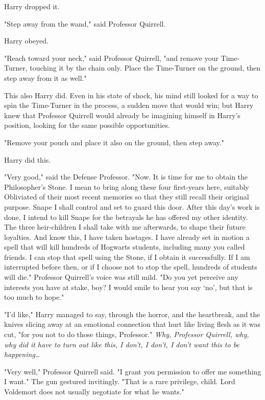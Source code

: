 Harry dropped it.

"Step away from the wand," said Professor Quirrell.

Harry obeyed.

"Reach toward your neck," said Professor Quirrell, "and remove your
Time-Turner, touching it by the chain only. Place the Time-Turner on the
ground, then step away from it as well."

This also Harry did. Even in his state of shock, his mind still looked for a
way to spin the Time-Turner in the process, a sudden move that would win; but
Harry knew that Professor Quirrell would already be imagining himself in
Harry's position, looking for the same possible opportunities.

"Remove your pouch and place it also on the ground, then step away."

Harry did this.

"Very good," said the Defense Professor. "Now. It is time for me to obtain the
Philosopher's Stone. I mean to bring along these four first-years here,
suitably Obliviated of their most recent memories so that they still recall
their original purpose. Snape I shall control and set to guard this door. After
this day's work is done, I intend to kill Snape for the betrayals he has
offered my other identity. The three heir-children I shall take with me
afterwards, to shape their future loyalties. And know this, I have taken
hostages. I have already set in motion a spell that will kill hundreds of
Hogwarts students, including many you called friends. I can stop that spell
using the Stone, if I obtain it successfully. If I am interrupted before then,
or if I choose not to stop the spell, hundreds of students will die." Professor
Quirrell's voice was still mild. "Do you yet perceive any interests you have at
stake, boy? I would smile to hear you say `no', but that is too much to hope."

"I'd like," Harry managed to say, through the horror, and the heartbreak, and
the knives slicing away at an emotional connection that hurt like living flesh
as it was cut, "for you not to do those things, Professor." \emph{Why,
Professor Quirrell, why, why did it have to turn out like this, I don't, I
don't, I don't want this to be happening{\ldots}}

"Very well," Professor Quirrell said. "I grant you permission to offer me
something I want." The gun gestured invitingly. "That is a rare privilege,
child. Lord Voldemort does not usually negotiate for what he wants."

